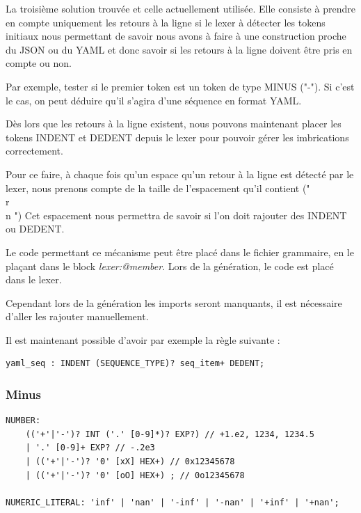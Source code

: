 \documentclass[
    iict, %
    il, %
]{heig-tb}
\begin{document}
La troisième solution trouvée et celle actuellement utilisée. Elle consiste à prendre en compte uniquement les retours à la ligne si le lexer à détecter les tokens initiaux
nous permettant de savoir nous avons à faire à une construction proche du JSON ou du YAML et donc savoir si les retours à la ligne doivent être pris en compte ou non.

Par exemple, tester si le premier token est un token de type MINUS ("-"). Si c'est le cas, on peut déduire qu'il s'agira d'une séquence en format YAML.

Dès lors que les retours à la ligne existent, nous pouvons maintenant placer les tokens INDENT et DEDENT depuis le lexer
pour pouvoir gérer les imbrications correctement.

Pour ce faire, à chaque fois qu'un espace qu'un retour à la ligne est détecté par le lexer, nous prenons compte de la taille de l'espacement qu'il contient ("\\r\\n    ")
Cet espacement nous permettra de savoir si l'on doit rajouter des INDENT ou DEDENT.

Le code permettant ce mécanisme peut être placé dans le fichier grammaire, en le plaçant dans le block \emph{lexer:@member{}}.
Lors de la génération, le code est placé dans le lexer.

Cependant lors de la génération les imports seront manquants, il est nécessaire d'aller les rajouter manuellement.



Il est maintenant possible d'avoir par exemple la règle suivante :

\begin{lstlisting}[frame=single,caption={generator-code},label={generator-code}]
    yaml_seq : INDENT (SEQUENCE_TYPE)? seq_item+ DEDENT;
\end{lstlisting}

\subsubsection{Minus}
\begin{lstlisting}[frame=single,caption={uon-number},label={uon-number}]
NUMBER:
	(('+'|'-')? INT ('.' [0-9]*)? EXP?) // +1.e2, 1234, 1234.5
	| '.' [0-9]+ EXP? // -.2e3
	| (('+'|'-')? '0' [xX] HEX+) // 0x12345678
	| (('+'|'-')? '0' [oO] HEX+) ; // 0o12345678

NUMERIC_LITERAL: 'inf' | 'nan' | '-inf' | '-nan' | '+inf' | '+nan';
\end{lstlisting}
\end{document}
